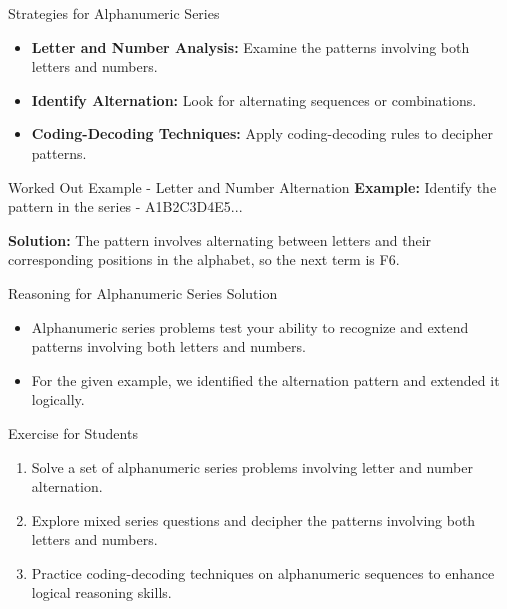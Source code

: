 \begin{frame}{Strategies for Alphanumeric Series}
  \begin{itemize}
    \item \textbf{Letter and Number Analysis:} Examine the patterns involving both letters and numbers.
    \item \textbf{Identify Alternation:} Look for alternating sequences or combinations.
    \item \textbf{Coding-Decoding Techniques:} Apply coding-decoding rules to decipher patterns.
  \end{itemize}
\end{frame}

\begin{frame}{Worked Out Example - Letter and Number Alternation}
  \textbf{Example:} Identify the pattern in the series - A1B2C3D4E5...

  \textbf{Solution:} The pattern involves alternating between letters and their corresponding positions in the alphabet, so the next term is F6.
\end{frame}

\begin{frame}{Reasoning for Alphanumeric Series Solution}
  \begin{itemize}
    \item Alphanumeric series problems test your ability to recognize and extend patterns involving both letters and numbers.
    \item For the given example, we identified the alternation pattern and extended it logically.
  \end{itemize}
\end{frame}

\begin{frame}{Exercise for Students}
  \begin{enumerate}
    \item Solve a set of alphanumeric series problems involving letter and number alternation.
    \item Explore mixed series questions and decipher the patterns involving both letters and numbers.
    \item Practice coding-decoding techniques on alphanumeric sequences to enhance logical reasoning skills.
  \end{enumerate}
\end{frame}
